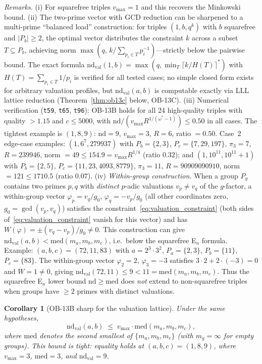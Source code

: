 \documentclass[12pt]{article}
\newtheorem{corollary}[theorem]{Corollary}
\theoremstyle{definition}
\begin{document}
\noindent
\textit{Remarks.}
(i) For squarefree triples $v_{\max}=1$ and this recovers the Minkowski bound.
(ii) The two-prime vector with GCD reduction can be sharpened to a multi-prime
``balanced load'' construction: for triples $(1,b,q^k)$ with $b$ squarefree and $|P_b| \ge 2$,
the optimal vector distributes the constraint $k$ across a subset $T \subseteq P_b$,
achieving norm $\max(q,\, k/\sum_{p_i \in T} p_i^{-1})$---strictly below the pairwise bound.
The exact formula $\mathrm{nd}_{\mathrm{val}}(1,b)
  = \max(q,\min_T\lceil k/H(T)\rceil^*)$
with $H(T) = \sum_{p_i \in T} 1/p_i$ is verified for all tested cases; no simple
closed form exists for arbitrary valuation profiles, but
$\mathrm{nd}_{\mathrm{val}}(a,b)$ is
computable exactly via LLL lattice reduction (Theorem~\ref{thm:ob13c} below, OB-13C).
(iii) Numerical verification (\texttt{t59}, \texttt{t65}, \texttt{t96}):
OB-13B holds for all 24 high-quality triples with quality $> 1.15$ and $c \le 5000$,
with $\mathrm{nd}/(v_{\max} R^{1/(\omega^*-1)}) \le 0.50$ in all cases.
The tightest example is $(1,8,9)$: $\mathrm{nd}=9$, $v_{\max}=3$, $R=6$, ratio $= 0.50$.
Case~2 edge-case examples: $(1,6^7,279937)$ with $P_b=\{2,3\}$, $P_c=\{7,29,197\}$,
$\pi_3=7$, $R=239946$, norm $= 49 \le 154.9 = v_{\max} R^{1/4}$ (ratio $0.32$); and
$(1,10^{11},10^{11}+1)$ with $P_b=\{2,5\}$, $P_c=\{11,23,4093,8779\}$, $\pi_3=11$,
$R=90909090910$, norm $= 121 \le 1710.5$ (ratio $0.07$).
(iv) \emph{Within-group construction.}
When a group $P_g$ contains two primes $p, q$ with \emph{distinct} $p$-adic valuations
$v_p \ne v_q$ of the $g$-factor, a within-group vector $\varphi_p = v_q/g_0$,
$\varphi_q = -v_p/g_0$ (all other coordinates zero, $g_0 = \gcd(v_p, v_q)$) satisfies
the constraint~\eqref{eq:valuation_constraint} (both sides of~\ref{eq:valuation_constraint} vanish for this vector) and has
$W(\varphi) = \pm(v_q - v_p)/g_0 \ne 0$.
This construction can give
$\mathrm{nd}_{\mathrm{val}}(a,b) < \mathrm{med}(m_a,m_b,m_c)$,
i.e.\ below the squarefree E$_n$ formula.
Example: $(a,b,c) = (72, 11, 83)$ with $a = 2^3 \cdot 3^2$, $P_a = \{2,3\}$,
$P_b = \{11\}$, $P_c = \{83\}$. The within-group vector $\varphi_2 = 2$, $\varphi_3 = -3$
satisfies $3 \cdot 2 + 2\cdot(-3) = 0$ and $W = 1 \ne 0$, giving
$\mathrm{nd}_{\mathrm{val}}(72,11) \le 9 < 11 = \mathrm{med}(m_a,m_b,m_c)$.
Thus the squarefree E$_n$ lower bound $\mathrm{nd} \ge \mathrm{med}$ does \emph{not} extend
to non-squarefree triples when groups have $\ge 2$ primes with distinct valuations.

\begin{corollary}[OB-13B sharp for the valuation lattice]\label{cor:ob13b-sharp}
Under the same hypotheses,
\[
  \mathrm{nd}_{\mathrm{val}}(a,b) \;\le\; v_{\max} \cdot \mathrm{med}(m_a, m_b, m_c),
\]
where $\mathrm{med}$ denotes the second smallest of $\{m_a, m_b, m_c\}$ (with $m_g = \infty$
for empty groups).  This bound is tight: equality holds at $(a,b,c)=(1,8,9)$,
where $v_{\max}=3$, $\mathrm{med}=3$, and $\mathrm{nd}_{\mathrm{val}}=9$.
\end{corollary}
\end{document}
